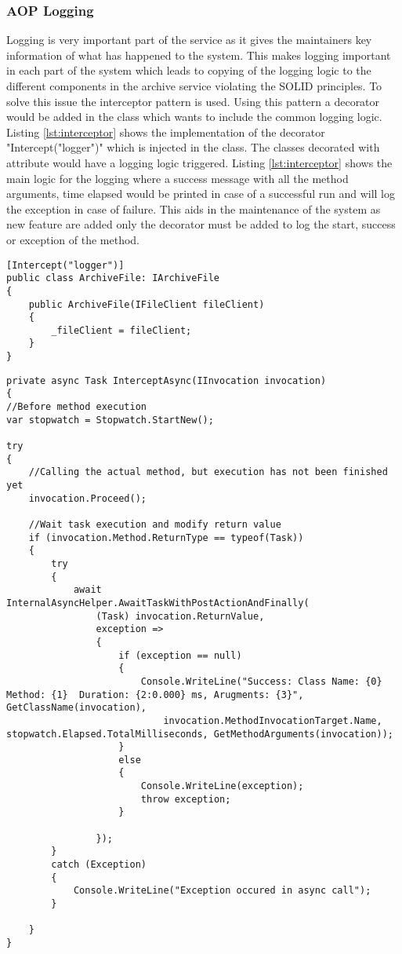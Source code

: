 \subsubsection{AOP Logging}
Logging is very important part of the service as it gives the maintainers key information of what has happened to the system. This makes logging important
in each part of the system which leads to copying of the logging logic to the different components in the archive service violating the SOLID \cite{Hotop2015} principles. 
To solve this issue the interceptor pattern is used. Using this pattern a decorator would be added in the class which wants to include the common
logging logic. Listing \ref{lst:interceptor} shows the implementation of the decorator "Intercept("logger")" which is injected in the class. The 
classes decorated with attribute would have a logging logic triggered. Listing \ref{lst:interceptor} shows the main logic for the logging where a success message
with all the method arguments, time elapsed would be printed in case of a successful run and will log the exception in case of failure. This aids in the maintenance
of the system as new feature are added only the decorator must be added to log the start, success or exception of the method.

\newpage
\begin{lstlisting}[language={[Sharp]C}, caption={Interceptor decorator example}, captionpos=b,label={lst:interceptor}]
[Intercept("logger")]
public class ArchiveFile: IArchiveFile
{
    public ArchiveFile(IFileClient fileClient)
    {
        _fileClient = fileClient;
    }
}
\end{lstlisting}            

\begin{lstlisting}[language={[Sharp]C}, caption={Interceptor logger logic implementation}, captionpos=b,label={lst:interceptor}]
private async Task InterceptAsync(IInvocation invocation)
{
//Before method execution
var stopwatch = Stopwatch.StartNew();

try
{
    //Calling the actual method, but execution has not been finished yet
    invocation.Proceed();

    //Wait task execution and modify return value
    if (invocation.Method.ReturnType == typeof(Task))
    {
        try
        {
            await InternalAsyncHelper.AwaitTaskWithPostActionAndFinally(
                (Task) invocation.ReturnValue,
                exception =>
                {
                    if (exception == null)
                    {
                        Console.WriteLine("Success: Class Name: {0} Method: {1}  Duration: {2:0.000} ms, Arugments: {3}", GetClassName(invocation),
                            invocation.MethodInvocationTarget.Name, stopwatch.Elapsed.TotalMilliseconds, GetMethodArguments(invocation));
                    }
                    else
                    {
                        Console.WriteLine(exception);
                        throw exception;
                    }
                    
                });
        }
        catch (Exception)
        {
            Console.WriteLine("Exception occured in async call");
        }
        
    }
}
\end{lstlisting}            
